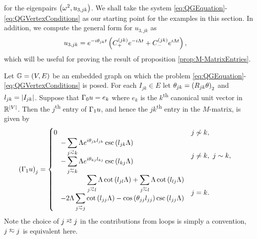 for the eigenpairs $\left( \omega^2, u_{3,jk} \right)$.
We shall take the system \eqref{eq:QGEquation}-\eqref{eq:QGVertexConditions} as our starting point for the examples in this section.
In addition, we compute the general form for $u_{3,jk}$ as
\begin{align} \label{eq:CurlEdgeEqnGenSol}
	u_{3,jk} &= e^{-i\theta_{jk}t}\left(  C_{+}^{(jk)}e^{-i\Lambda t} + C_{-}^{(jk)}e^{i\Lambda t}  \right),
\end{align}
which will be useful for proving the result of proposition \ref{prop:M-MatrixEntries}. \newline

\begin{prop} \label{prop:M-MatrixEntries}
	Let $\mathbb{G}=\left( V,E \right)$ be an embedded graph on which the problem \eqref{eq:QGEquation}-\eqref{eq:QGVertexConditions} is posed.
	For each $I_{jk}\in E$ let $\theta_{jk} = \left( R_{jk}\theta \right)_2$ and $l_{jk} = \left\lvert I_{jk} \right\rvert$.
	Suppose that $\Gamma_0 u = e_k$ where $e_k$ is the $k$\textsuperscript{th} canonical unit vector in $\mathbb{R}^{\left\lvert V \right\rvert}$.
	Then the $j$\textsuperscript{th} entry of $\Gamma_1 u$, and hence the $jk$\textsuperscript{th} entry in the $M$-matrix, is given by
	\begin{align*}
		\bracs{\nmap u}_j &= 
		\begin{cases}
			\!\begin{aligned}
				0	
			\end{aligned}			
			& j \not\con k, \\
			\!\begin{aligned}
				-\sum_{j\conLeft k} \effFreq e^{i\qm_{jk}l_{jk}} \csc\bracs{l_{jk}\effFreq} 
				\\ \quad - \sum_{j\conRight k} \effFreq e^{i\qm_{kj}l_{kj}} \csc\bracs{l_{kj}\effFreq}
			\end{aligned}
			& j\neq k, \ j\con k, \\
			\!\begin{aligned}
				\sum_{j\conLeft l} \effFreq\cot\bracs{l_{jl}\effFreq}
				+ \sum_{j\conRight l} \effFreq\cot\bracs{l_{lj}\effFreq}
				\\ \quad - 2\effFreq\sum_{j\conLeft j} \cot\bracs{l_{jj}\effFreq} - \cos\bracs{\qm_{jj}l_{jj}}\csc\bracs{l_{jj}\effFreq}
			\end{aligned}
			& j=k.
		\end{cases}
	\end{align*}
	Note the choice of $j\conLeft j$ in the contributions from loops is simply a convention, $j\conRight j$ is equivalent here.
\end{prop}

